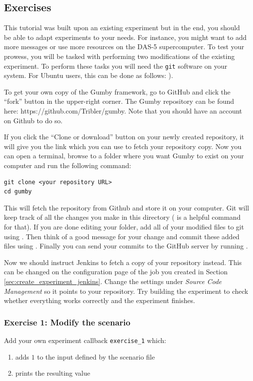 \documentclass{article}
\begin{document}
\subsection{Exercises}

This tutorial was built upon an existing experiment but in the end, you should be able to adapt experiments to your needs.
For instance, you might want to add more messages or use more resources on the DAS-5 supercomputer.
To test your prowess, you will be tasked with performing two modifications of the existing experiment.
To perform these tasks you will need the \texttt{git} software on your system.
For Ubuntu users, this can be done as follows: ).

\noindent To get your own copy of the Gumby framework, go to GitHub and click the ``fork'' button in the upper-right corner.
The Gumby repository can be found here: https://github.com/Tribler/gumby.
Note that you should have an account on Github to do so.

If you click the ``Clone or download'' button on your newly created repository, it will give you the link which you can use to fetch your repository copy.
Now you can open a terminal, browse to a folder where you want Gumby to exist on your computer and run the following command:

\begin{lstlisting}[frame=single]
git clone <your repository URL>
cd gumby
\end{lstlisting}

This will fetch the repository from Github and store it on your computer.
Git will keep track of all the changes you make in this directory ( is a helpful command for that).
If you are done editing your folder, add all of your modified files to git using .
Then think of a good message for your change and commit these added files using .
Finally you can send your commits to the GitHub server by running .

Now we should instruct Jenkins to fetch a copy of your repository instead.
This can be changed on the configuration page of the job you created in Section \ref{sec:create_experiment_jenkins}.
Change the settings under \emph{Source Code Management} so it points to your repository.
Try building the experiment to check whether everything works correctly and the experiment finishes.

\subsubsection{Exercise 1: Modify the scenario}
Add your own experiment callback \texttt{exercise\_1} which:
\begin{enumerate}
	\item adds $1$ to the input defined by the scenario file
	\item prints the resulting value
\end{enumerate}
\end{document}

